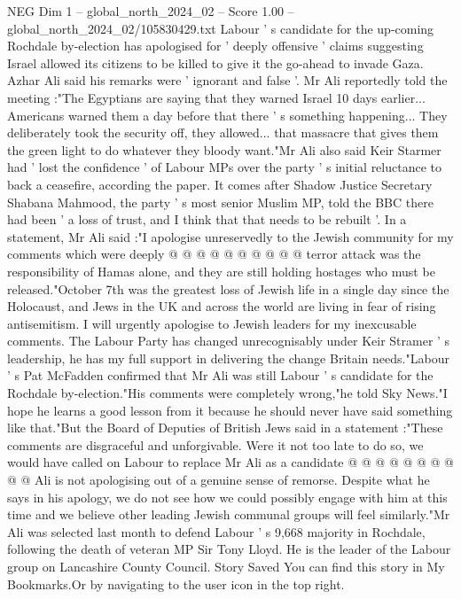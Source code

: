 \begin{textsample}{NEG Dim 1 – global\_north\_2024\_02 – Score 1.00 – global\_north\_2024\_02/105830429.txt}  \label{ex:f1_neg_351}
Labour ' s candidate for the up-coming Rochdale by-election has apologised for ' deeply offensive ' claims suggesting Israel allowed its citizens to be killed to give it the go-ahead to invade Gaza.
Azhar Ali said his remarks were ' ignorant and false '.
Mr Ali reportedly told the meeting :"The Egyptians are saying that they warned Israel 10 days earlier...
Americans warned them a day before that there ' s something happening...
They deliberately took the security off, they allowed... that massacre that gives them the green light to do whatever they bloody want."Mr Ali also said Keir Starmer had ' lost the confidence ' of Labour MPs over the party ' s initial reluctance to back a ceasefire, according the paper.
It comes after Shadow Justice Secretary Shabana Mahmood, the party ' s most senior Muslim MP, told the BBC there had been ' a loss of trust, and I think that that needs to be rebuilt '.
In a statement, Mr Ali said :"I apologise unreservedly to the Jewish community for my comments which were deeply @ @ @ @ @ @ @ @ @ @ terror attack was the responsibility of Hamas alone, and they are still holding hostages who must be released."October 7th was the greatest loss of Jewish life in a single day since the Holocaust, and Jews in the UK and across the world are living in fear of rising antisemitism.
I will urgently apologise to Jewish leaders for my inexcusable comments.
The Labour Party has changed unrecognisably under Keir Stramer ' s leadership, he has my full support in delivering the change Britain needs."Labour ' s Pat McFadden confirmed that Mr Ali was still Labour ' s candidate for the Rochdale by-election."His comments were completely wrong,"he told Sky News."I hope he learns a good lesson from it because he should never have said something like that."But the Board of Deputies of British Jews said in a statement :"These comments are disgraceful and unforgivable.
Were it not too late to do so, we would have called on Labour to replace Mr Ali as a candidate @ @ @ @ @ @ @ @ @ @ Ali is not apologising out of a genuine sense of remorse.
Despite what he says in his apology, we do not see how we could possibly engage with him at this time and we believe other leading Jewish communal groups will feel similarly."Mr Ali was selected last month to defend Labour ' s 9,668 majority in Rochdale, following the death of veteran MP Sir Tony Lloyd.
He is the leader of the Labour group on Lancashire County Council.
Story Saved You can find this story in My Bookmarks.Or by navigating to the user icon in the top right.

\end{textsample}
